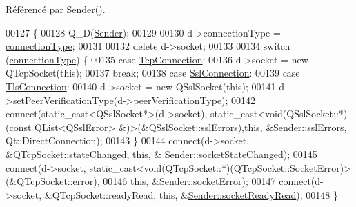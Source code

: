 Référencé par \hyperlink{class_simple_mail_1_1_sender_a120ee6620d9f22b5c008b27743d03a6d}{Sender()}.


\begin{DoxyCode}
00127 \{
00128     Q\_D(\hyperlink{class_simple_mail_1_1_sender}{Sender});
00129 
00130     d->connectionType = \hyperlink{class_simple_mail_1_1_sender_a044468efe3bafa577a3039b997a4ae23}{connectionType};
00131 
00132     \textcolor{keyword}{delete} d->socket;
00133 
00134     \textcolor{keywordflow}{switch} (\hyperlink{class_simple_mail_1_1_sender_a044468efe3bafa577a3039b997a4ae23}{connectionType}) \{
00135     \textcolor{keywordflow}{case} \hyperlink{class_simple_mail_1_1_sender_a89e6a9572b306441237f6b6635729d1aa7de3defa96cacca9817fbea9b9aecf56}{TcpConnection}:
00136         d->socket = \textcolor{keyword}{new} QTcpSocket(\textcolor{keyword}{this});
00137         \textcolor{keywordflow}{break};
00138     \textcolor{keywordflow}{case} \hyperlink{class_simple_mail_1_1_sender_a89e6a9572b306441237f6b6635729d1aadd47ac04a99ebb279aaa4cf5cdfa78f5}{SslConnection}:
00139     \textcolor{keywordflow}{case} \hyperlink{class_simple_mail_1_1_sender_a89e6a9572b306441237f6b6635729d1aa3461f2931e043fc3ea86a0015c735159}{TlsConnection}:
00140         d->socket = \textcolor{keyword}{new} QSslSocket(\textcolor{keyword}{this});
00141         d->setPeerVerificationType(d->peerVerificationType);
00142         connect(static\_cast<QSslSocket*>(d->socket), static\_cast<\textcolor{keywordtype}{void}(QSslSocket::*)(\textcolor{keyword}{const} QList<QSslError>
       &)>(&QSslSocket::sslErrors),\textcolor{keyword}{this}, &\hyperlink{class_simple_mail_1_1_sender_a8b87c2e54a9dcd225495536cebc4fb27}{Sender::sslErrors}, Qt::DirectConnection);
00143     \}
00144     connect(d->socket, &QTcpSocket::stateChanged, \textcolor{keyword}{this}, &
      \hyperlink{class_simple_mail_1_1_sender_a40254c3f25402c5f9f813924a4770cd6}{Sender::socketStateChanged});
00145     connect(d->socket, static\_cast<\textcolor{keywordtype}{void}(QTcpSocket::*)(QTcpSocket::SocketError)>(&QTcpSocket::error),
00146             \textcolor{keyword}{this}, &\hyperlink{class_simple_mail_1_1_sender_a90dce16e10ea98518297b03eacb06812}{Sender::socketError});
00147     connect(d->socket, &QTcpSocket::readyRead, \textcolor{keyword}{this}, &\hyperlink{class_simple_mail_1_1_sender_a10913c23ccdb416865aa82a9139c6a08}{Sender::socketReadyRead});
00148 \}
\end{DoxyCode}
\mbox{\label{class_simple_mail_1_1_sender_a18c47159817fafe9dd3f75855028f70a}} 
